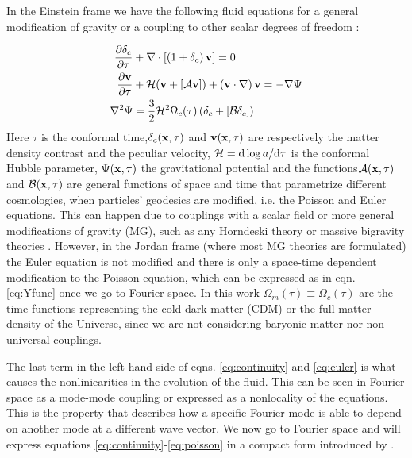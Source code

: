 In the Einstein frame we have the following fluid equations for a
general modification of gravity or a coupling to other scalar degrees
of freedom \cite{pietroni_flowing_2008}:

\begin{align}
\frac{\partial\delta_{c}}{\partial\tau} & +\nabla\cdot\left[\left(1+\delta_{c}\right)\mathbf{v}\right]=0\label{eq:continuity}\\
\frac{\partial\mathbf{v}}{\partial\tau} & +\mathcal{H}(\mathbf{v}+\left[\mathcal{A}\mathbf{v}\right])+\left(\mathbf{v}\cdot\nabla\right)\mathbf{v}=-\nabla\Psi\label{eq:euler}\\
\nabla^{2}\Psi & =\frac{3}{2}\mathcal{H}^{2}\Omega_{c}(\tau)\left(\delta_{c}+\left[\mathcal{B}\delta_{c}\right]\right)\label{eq:poisson}
\end{align}
Here $\tau$ is the conformal time,$\delta_{c}(\mathbf{x},\tau)$ and $\mathbf{v}(\mathbf{x},\tau)$
are respectively the matter density contrast and the peculiar velocity,
$\mathcal{H}=\mathrm{d}\log a/\mathrm{d}\tau$ is the conformal Hubble parameter, $\Psi(\mathbf{x},\tau)$
the gravitational potential and the functions$\mathcal{A}(\mathbf{x},\tau)$
and $\mathcal{B}(\mathbf{x},\tau)$ are general functions of space and
time that parametrize different cosmologies, when particles' geodesics
are modified, i.e. the Poisson and Euler equations. This can happen
due to couplings with a scalar field or more general modifications
of gravity (MG), such as any Horndeski theory or massive bigravity
theories \cite{amendola_observables_2012}. However, in the Jordan
frame (where most MG theories are formulated) the Euler equation is
not modified and there is only a space-time dependent modification
to the Poisson equation, which can be expressed as in eqn. \ref{eq:Yfunc}
once we go to Fourier space. In this work $\Omega_{m}(\tau)$$\equiv$$\Omega_{c}(\tau)$
are the time functions representing the cold dark matter (CDM) or
the full matter density of the Universe, since we are not considering
baryonic matter nor non-universal couplings.

The last term in the left hand side of eqns. \ref{eq:continuity}
and \ref{eq:euler} is what causes the nonliniearities in the evolution
of the fluid. This can be seen in Fourier space as a mode-mode coupling
or expressed as a nonlocality of the equations. This is the property
that describes how a specific Fourier mode is able to depend on another
mode at a different wave vector. We now go to Fourier space and will
express equations \ref{eq:continuity}-\ref{eq:poisson} in a compact
form introduced by \cite{scoccimarro_new_2000}.

